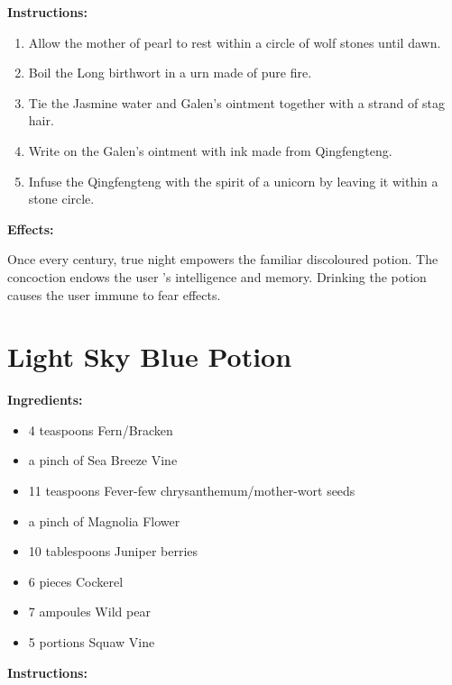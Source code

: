 \documentclass{article}
\begin{document}
\textbf{Instructions:}

\begin{enumerate}
  \item Allow the mother of pearl to rest within a circle of wolf stones until dawn.
  \item Boil the Long birthwort in a urn made of pure fire.
  \item Tie the Jasmine water and Galen's ointment together with a strand of stag hair.
  \item Write on the Galen's ointment with ink made from Qingfengteng.
  \item Infuse the Qingfengteng with the spirit of a unicorn by leaving it within a stone circle.
\end{enumerate}

\textbf{Effects:}

Once every century, true night empowers the familiar discoloured potion. The concoction endows the user 's intelligence and memory. Drinking the potion causes the user immune to fear effects.

\newpage
\section*{Light Sky Blue Potion}

\textbf{Ingredients:}

\begin{itemize}
  \item 4 teaspoons Fern/Bracken
  \item a pinch of Sea Breeze Vine
  \item 11 teaspoons Fever-few chrysanthemum/mother-wort seeds
  \item a pinch of Magnolia Flower
  \item 10 tablespoons Juniper berries
  \item 6 pieces Cockerel
  \item 7 ampoules Wild pear
  \item 5 portions Squaw Vine
\end{itemize}

\textbf{Instructions:}
\end{document}
